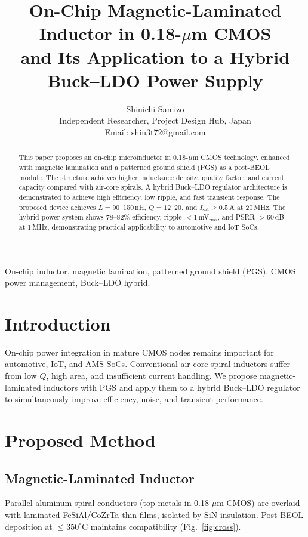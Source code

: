 \documentclass[journal]{IEEEtran}
\begin{document}
\title{On-Chip Magnetic-Laminated Inductor in 0.18-$\mu$m CMOS\\
and Its Application to a Hybrid Buck--LDO Power Supply}

\author{Shinichi Samizo\\
Independent Researcher, Project Design Hub, Japan\\
Email: shin3t72@gmail.com}

\maketitle

\begin{abstract}
This paper proposes an on-chip microinductor in 0.18-$\mu$m CMOS technology, enhanced with magnetic lamination and a patterned ground shield (PGS) as a post-BEOL module. The structure achieves higher inductance density, quality factor, and current capacity compared with air-core spirals. A hybrid Buck--LDO regulator architecture is demonstrated to achieve high efficiency, low ripple, and fast transient response. The proposed device achieves $L=90$--150\,nH, $Q=12$--20, and $I_{\text{sat}} \geq 0.5$\,A at 20\,MHz. The hybrid power system shows 78--82\% efficiency, ripple $<1$\,mV$_{\text{rms}}$, and PSRR $>60$\,dB at 1\,MHz, demonstrating practical applicability to automotive and IoT SoCs.
\end{abstract}

\begin{IEEEkeywords}
On-chip inductor, magnetic lamination, patterned ground shield (PGS), CMOS power management, Buck--LDO hybrid.
\end{IEEEkeywords}

\section{Introduction}
On-chip power integration in mature CMOS nodes remains important for automotive, IoT, and AMS SoCs. Conventional air-core spiral inductors suffer from low $Q$, high area, and insufficient current handling. We propose magnetic-laminated inductors with PGS and apply them to a hybrid Buck--LDO regulator to simultaneously improve efficiency, noise, and transient performance.

\section{Proposed Method}
\subsection{Magnetic-Laminated Inductor}
Parallel aluminum spiral conductors (top metals in 0.18-$\mu$m CMOS) are overlaid with laminated FeSiAl/CoZrTa thin films, isolated by SiN insulation. Post-BEOL deposition at $\leq350^\circ$C maintains compatibility (Fig.~\ref{fig:cross}).
\end{document}
